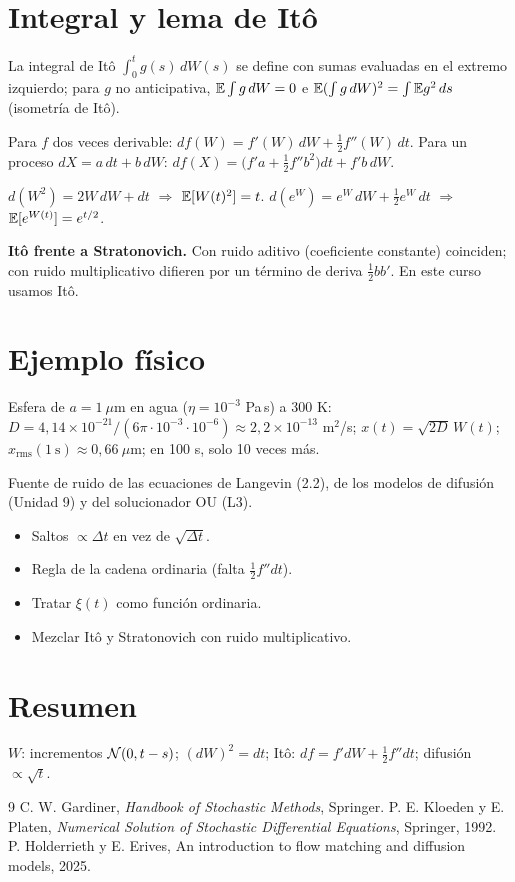 \documentclass[11pt,a4paper]{article}
\begin{document}
\section{Integral y lema de Itô}
La integral de Itô $\int_0^tg(s)\,dW(s)$ se define con sumas evaluadas en el extremo izquierdo; para $g$ no anticipativa,
$\mathbb{E}\int g\,dW=0$ e $\mathbb{E}(\int g\,dW)^2=\int\mathbb{E} g^2\,ds$ (isometría de Itô).
\begin{resultado}
Para $f$ dos veces derivable: $df(W)=f'(W)\,dW+\tfrac12f''(W)\,dt$. Para un proceso $dX=a\,dt+b\,dW$:
$df(X)=\big(f'a+\tfrac12f''b^2\big)dt+f'b\,dW$.
\end{resultado}
\begin{ejemplo}
$d(W^2)=2W\,dW+dt$ $\Rightarrow$ $\mathbb{E}[W(t)^2]=t$. $d(e^W)=e^W\,dW+\frac12e^W\,dt$ $\Rightarrow$ $\mathbb{E}[e^{W(t)}]=e^{t/2}$.
\end{ejemplo}
\textbf{Itô frente a Stratonovich.} Con ruido aditivo (coeficiente constante) coinciden; con ruido multiplicativo
difieren por un término de deriva $\frac12bb'$. En este curso usamos Itô.

\section{Ejemplo físico}
Esfera de $a=1\ \mu$m en agua ($\eta=10^{-3}$ Pa\,s) a 300 K: $D=4{,}14\times10^{-21}/(6\pi\cdot10^{-3}\cdot10^{-6})\approx2{,}2\times10^{-13}$ m$^2$/s;
$x(t)=\sqrt{2D}\,W(t)$; $x_{\text{rms}}(1\ \text{s})\approx0{,}66\ \mu$m; en 100 s, solo 10 veces más.

\begin{aplicacion}
Fuente de ruido de las ecuaciones de Langevin (2.2), de los modelos de difusión (Unidad 9) y del solucionador OU (L3).
\end{aplicacion}

\begin{error}
\begin{itemize}[nosep]
\item Saltos $\propto\Delta t$ en vez de $\sqrt{\Delta t}$.
\item Regla de la cadena ordinaria (falta $\frac12f''dt$).
\item Tratar $\xi(t)$ como función ordinaria.
\item Mezclar Itô y Stratonovich con ruido multiplicativo.
\end{itemize}
\end{error}

\section{Resumen}
$W$: incrementos $\mathcal{N}(0,t-s)$; $(dW)^2=dt$; Itô: $df=f'dW+\frac12f''dt$; difusión $\propto\sqrt t$.

\begin{thebibliography}{9}\small
{} C. W. Gardiner, \emph{Handbook of Stochastic Methods}, Springer.
 P. E. Kloeden y E. Platen, \emph{Numerical Solution of Stochastic Differential Equations}, Springer, 1992.
 P. Holderrieth y E. Erives, An introduction to flow matching and diffusion models, 2025.
\end{thebibliography}
\end{document}

